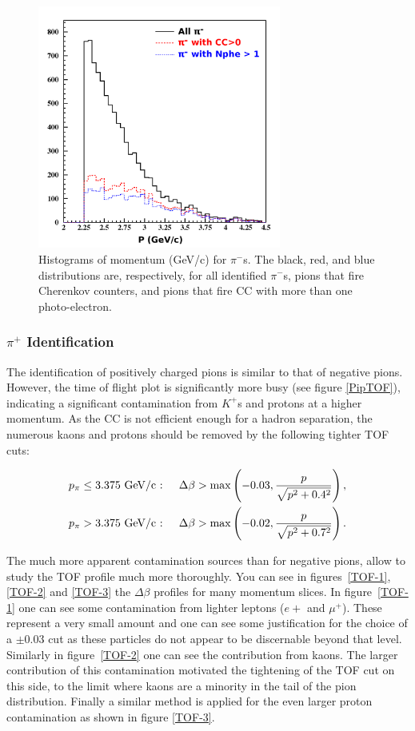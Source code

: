 \begin{figure}[tbp]
\centering
\includegraphics[width=8cm] {chap5-fig/fig06.png} 
\caption {Histograms of momentum (GeV/c) for $\pi^-$s. The black, red, and blue distributions are, respectively, for all identified $\pi^-$s, pions that fire Cherenkov counters, and pions that fire CC with more than one photo-electron.}
\label{PionCC}
\end{figure}

\subsubsection{$\pi^+$ Identification}

The identification of positively charged pions is similar to that of negative 
pions. However, the time of flight plot is significantly more busy (see figure 
\ref{PipTOF}), indicating a significant contamination from $K^+$s and protons at a
higher momentum. As the CC is not efficient enough for a hadron separation, the 
numerous kaons and protons should be removed by the following tighter TOF cuts:

\begin{subequations}\label{TOF-Pip}
\begin{align}
    p_\pi &\leq 3.375 \text{ GeV/c : }
  & \Delta \beta &> \max\left(-0.03,{p \over\sqrt{p^2+0.4^2}}\right), \\ 
    p_\pi &> 3.375    \text{ GeV/c : }
  & \Delta \beta &> \max\left(-0.02,{p \over\sqrt{p^2+0.7^2}}\right).
\end{align}
\end{subequations}

The much more apparent contamination sources than for negative pions, allow to study 
the TOF profile much more thoroughly. You can see in figures~\ref{TOF-1}, \ref{TOF-2} and 
\ref{TOF-3} the $\Delta \beta$ profiles for many momentum slices. In figure~\ref{TOF-1}
one can see some contamination from lighter leptons ($e+$ and $\mu^+$). These represent
a very small amount and one can see some justification for the choice of a $\pm 0.03$
cut as these particles do not appear to be discernable beyond that level. Similarly
in figure~\ref{TOF-2} one can see the contribution from kaons. The larger contribution
of this contamination motivated the tightening of the TOF cut on this side, to the limit
where kaons are a minority in the tail of the pion distribution. Finally a similar 
method is applied for the even larger proton contamination as shown in figure \ref{TOF-3}.

